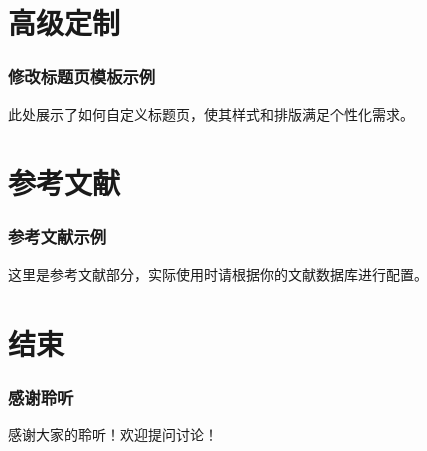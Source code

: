 \documentclass[aspectratio=169]{beamer}
\begin{document}
\section{高级定制}
\begin{frame}[fragile]
    \frametitle{修改标题页模板示例}
    此处展示了如何自定义标题页，使其样式和排版满足个性化需求。
\end{frame}

\section{参考文献}
\begin{frame}[allowframebreaks]
    \frametitle{参考文献示例}
    这里是参考文献部分，实际使用时请根据你的文献数据库进行配置。
\end{frame}

\section{结束}
\begin{frame}
    \frametitle{感谢聆听}
    感谢大家的聆听！欢迎提问讨论！
\end{frame}
\end{document}
